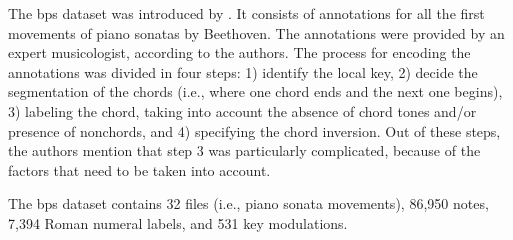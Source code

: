 

The \gls{bps} dataset was introduced by
\textcite{chen2018functional}. It consists of annotations
for all the first movements of piano sonatas by Beethoven.
The annotations were provided by an expert musicologist,
according to the authors. The process for encoding the
annotations was divided in four steps: 1) identify the local
key, 2) decide the segmentation of the chords (i.e., where
one chord ends and the next one begins), 3) labeling the
chord, taking into account the absence of chord tones
and/or presence of \gls{nonchord}s, and 4)
specifying the chord inversion. Out of these steps, the
authors mention that step 3 was particularly complicated,
because of the factors that need to be taken into account. 

The \gls{bps} dataset contains 32 files (i.e., piano sonata
movements), 86,950 notes, 7,394 Roman numeral labels, and
531 key modulations.
